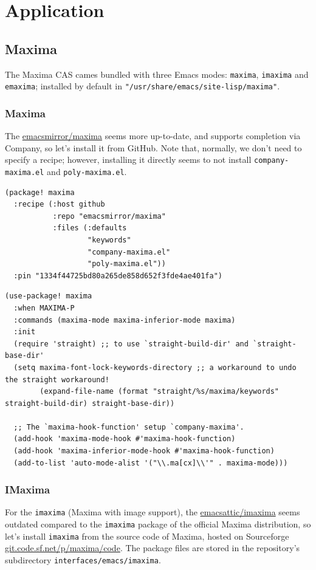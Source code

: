 \documentclass[11pt]{article}
\begin{document}
\section{Application}
\label{sec:org37eb961}
\subsection{Maxima}
\label{sec:orgc08449a}
The Maxima CAS cames bundled with three Emacs modes: \texttt{maxima}, \texttt{imaxima} and
\texttt{emaxima}; installed by default in \texttt{"/usr/share/emacs/site-lisp/maxima"}.

\subsubsection{Maxima}
\label{sec:org2249ad7}
The \href{https://github.com/emacsmirror/maxima}{emacsmirror/maxima} seems more up-to-date, and supports completion via
Company, so let's install it from GitHub. Note that, normally, we don't need to
specify a recipe; however, installing it directly seems to not install
\texttt{company-maxima.el} and \texttt{poly-maxima.el}.

\begin{verbatim}
(package! maxima
  :recipe (:host github
           :repo "emacsmirror/maxima"
           :files (:defaults
                   "keywords"
                   "company-maxima.el"
                   "poly-maxima.el"))
  :pin "1334f44725bd80a265de858d652f3fde4ae401fa")
\end{verbatim}

\begin{verbatim}
(use-package! maxima
  :when MAXIMA-P
  :commands (maxima-mode maxima-inferior-mode maxima)
  :init
  (require 'straight) ;; to use `straight-build-dir' and `straight-base-dir'
  (setq maxima-font-lock-keywords-directory ;; a workaround to undo the straight workaround!
        (expand-file-name (format "straight/%s/maxima/keywords" straight-build-dir) straight-base-dir))

  ;; The `maxima-hook-function' setup `company-maxima'.
  (add-hook 'maxima-mode-hook #'maxima-hook-function)
  (add-hook 'maxima-inferior-mode-hook #'maxima-hook-function)
  (add-to-list 'auto-mode-alist '("\\.ma[cx]\\'" . maxima-mode)))
\end{verbatim}

\subsubsection{IMaxima}
\label{sec:org818d337}
For the \texttt{imaxima} (Maxima with image support), the \href{https://github.com/emacsattic/imaxima}{emacsattic/imaxima} seems
outdated compared to the \texttt{imaxima} package of the official Maxima distribution, so
let's install \texttt{imaxima} from the source code of Maxima, hosted on Sourceforge
\href{https://git.code.sf.net/p/maxima/code}{git.code.sf.net/p/maxima/code}. The package files are stored in the repository's
subdirectory \texttt{interfaces/emacs/imaxima}.
\end{document}
